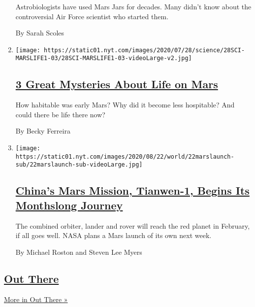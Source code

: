 \begin{enumerate}
  Astrobiologists have used Mars Jars for decades. Many didn't know
  about the controversial Air Force scientist who started them.

  By Sarah Scoles
\item
  \texttt{[image: https://static01.nyt.com/images/2020/07/28/science/28SCI-MARSLIFE1-03/28SCI-MARSLIFE1-03-videoLarge-v2.jpg]}

  \hypertarget{3-great-mysteries-about-life-on-mars}{%
  \subsection{\texorpdfstring{\href{/2020/07/24/science/mars-life-water.html}{3
  Great Mysteries About Life on
  Mars}}{3 Great Mysteries About Life on Mars}}\label{3-great-mysteries-about-life-on-mars}}

  How habitable was early Mars? Why did it become less hospitable? And
  could there be life there now?

  By Becky Ferreira
\item
  \texttt{[image: https://static01.nyt.com/images/2020/08/22/world/22marslaunch-sub/22marslaunch-sub-videoLarge.jpg]}

  \hypertarget{chinas-mars-mission-tianwen-1-begins-its-monthslong-journey}{%
  \subsection{\texorpdfstring{\href{/2020/07/22/science/mars-china-launch.html}{China's
  Mars Mission, Tianwen-1, Begins Its Monthslong
  Journey}}{China's Mars Mission, Tianwen-1, Begins Its Monthslong Journey}}\label{chinas-mars-mission-tianwen-1-begins-its-monthslong-journey}}

  The combined orbiter, lander and rover will reach the red planet in
  February, if all goes well. NASA plans a Mars launch of its own next
  week.

  By Michael Roston and Steven Lee Myers
\end{enumerate}

\hypertarget{out-there-2}{%
\subsection{\texorpdfstring{\href{/column/out-there}{Out
There}}{Out There}}\label{out-there-2}}

\href{/column/out-there}{More in Out There »}

